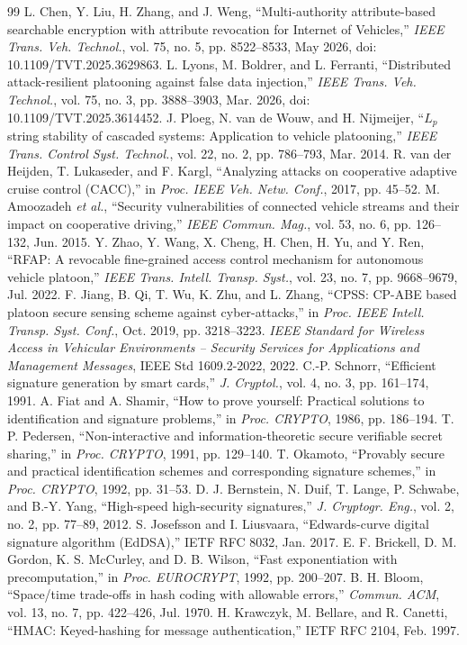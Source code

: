 \documentclass[journal]{IEEEtran}
\begin{document}
\begin{thebibliography}{99}
L. Chen, Y. Liu, H. Zhang, and J. Weng, ``Multi-authority attribute-based searchable encryption with attribute revocation for Internet of Vehicles,'' \emph{IEEE Trans. Veh. Technol.}, vol. 75, no. 5, pp. 8522--8533, May 2026, doi: 10.1109/TVT.2025.3629863.
L. Lyons, M. Boldrer, and L. Ferranti, ``Distributed attack-resilient platooning against false data injection,'' \emph{IEEE Trans. Veh. Technol.}, vol. 75, no. 3, pp. 3888--3903, Mar. 2026, doi: 10.1109/TVT.2025.3614452.
J. Ploeg, N. van de Wouw, and H. Nijmeijer, ``$L_p$ string stability of cascaded systems: Application to vehicle platooning,'' \emph{IEEE Trans. Control Syst. Technol.}, vol. 22, no. 2, pp. 786--793, Mar. 2014.
R. van der Heijden, T. Lukaseder, and F. Kargl, ``Analyzing attacks on cooperative adaptive cruise control (CACC),'' in \emph{Proc. IEEE Veh. Netw. Conf.}, 2017, pp. 45--52.
M. Amoozadeh \emph{et al.}, ``Security vulnerabilities of connected vehicle streams and their impact on cooperative driving,'' \emph{IEEE Commun. Mag.}, vol. 53, no. 6, pp. 126--132, Jun. 2015.
Y. Zhao, Y. Wang, X. Cheng, H. Chen, H. Yu, and Y. Ren, ``RFAP: A revocable fine-grained access control mechanism for autonomous vehicle platoon,'' \emph{IEEE Trans. Intell. Transp. Syst.}, vol. 23, no. 7, pp. 9668--9679, Jul. 2022.
F. Jiang, B. Qi, T. Wu, K. Zhu, and L. Zhang, ``CPSS: CP-ABE based platoon secure sensing scheme against cyber-attacks,'' in \emph{Proc. IEEE Intell. Transp. Syst. Conf.}, Oct. 2019, pp. 3218--3223.
\emph{IEEE Standard for Wireless Access in Vehicular Environments -- Security Services for Applications and Management Messages}, IEEE Std 1609.2-2022, 2022.
C.-P. Schnorr, ``Efficient signature generation by smart cards,'' \emph{J. Cryptol.}, vol. 4, no. 3, pp. 161--174, 1991.
A. Fiat and A. Shamir, ``How to prove yourself: Practical solutions to identification and signature problems,'' in \emph{Proc. CRYPTO}, 1986, pp. 186--194.
T. P. Pedersen, ``Non-interactive and information-theoretic secure verifiable secret sharing,'' in \emph{Proc. CRYPTO}, 1991, pp. 129--140.
T. Okamoto, ``Provably secure and practical identification schemes and corresponding signature schemes,'' in \emph{Proc. CRYPTO}, 1992, pp. 31--53.
D. J. Bernstein, N. Duif, T. Lange, P. Schwabe, and B.-Y. Yang, ``High-speed high-security signatures,'' \emph{J. Cryptogr. Eng.}, vol. 2, no. 2, pp. 77--89, 2012.
S. Josefsson and I. Liusvaara, ``Edwards-curve digital signature algorithm (EdDSA),'' IETF RFC 8032, Jan. 2017.
E. F. Brickell, D. M. Gordon, K. S. McCurley, and D. B. Wilson, ``Fast exponentiation with precomputation,'' in \emph{Proc. EUROCRYPT}, 1992, pp. 200--207.
B. H. Bloom, ``Space/time trade-offs in hash coding with allowable errors,'' \emph{Commun. ACM}, vol. 13, no. 7, pp. 422--426, Jul. 1970.
H. Krawczyk, M. Bellare, and R. Canetti, ``HMAC: Keyed-hashing for message authentication,'' IETF RFC 2104, Feb. 1997.
\end{thebibliography}
\end{document}
